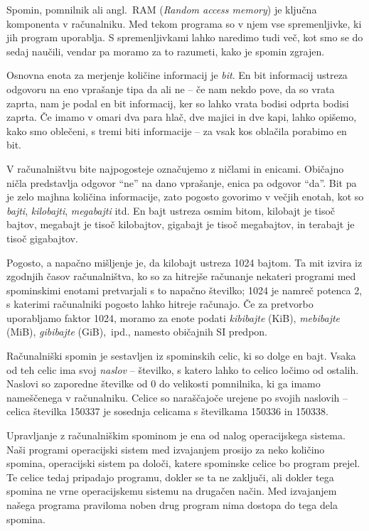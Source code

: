 \documentclass{book}
\begin{document}
Spomin, pomnilnik ali angl.~RAM (\textit{Random access memory})
je ključna komponenta v računalniku. Med tekom programa so v njem vse
spremenljivke, ki jih program uporablja. S spremenljivkami lahko naredimo tudi
več, kot smo se do sedaj naučili, vendar pa moramo za to razumeti, kako je
spomin zgrajen.

Osnovna enota za merjenje količine informacij je \emph{bit}.
En bit informacij ustreza odgovoru na eno vprašanje tipa da ali ne
-- če nam nekdo pove, da so vrata zaprta, nam je podal en bit informacij,
ker so lahko vrata bodisi odprta bodisi zaprta.
Če imamo v omari dva para hlač, dve majici in dve kapi, lahko opišemo,
kako smo oblečeni, s tremi biti informacije -- za vsak kos oblačila porabimo
en bit.

V računalništvu bite najpogosteje označujemo z ničlami in enicami.
Običajno ničla predstavlja odgovor ``ne'' na dano vprašanje,
enica pa odgovor ``da''. Bit pa je zelo majhna količina informacije, zato
pogosto govorimo v večjih enotah, kot so \emph{bajti}, \emph{kilobajti},
\emph{megabajti} itd. En bajt ustreza osmim bitom, kilobajt je tisoč bajtov,
megabajt je tisoč kilobajtov, gigabajt je tisoč megabajtov, in terabajt je
tisoč gigabajtov.

\begin{errors}
  Pogosto, a napačno mišljenje je, da kilobajt ustreza 1024 bajtom.
  Ta mit izvira iz zgodnjih časov računalništva, ko so za hitrejše
  računanje nekateri programi med spominskimi enotami pretvarjali
  s to napačno številko; 1024 je namreč potenca 2, s katerimi računalniki
  pogosto lahko hitreje računajo.
  Če za pretvorbo uporabljamo faktor 1024, moramo za enote podati
  \emph{kibibajte} (KiB), \emph{mebibajte} (MiB), \emph{gibibajte} (GiB),~ipd.,
  namesto običajnih SI predpon.
\end{errors}

Računalniški spomin je sestavljen iz spominskih celic, ki so dolge en bajt.
Vsaka od teh celic ima svoj \emph{naslov} -- številko, s katero lahko to
celico ločimo od ostalih. Naslovi so zaporedne številke od 0 do velikosti
pomnilnika, ki ga imamo nameščenega v računalniku.
Celice so naraščajoče urejene po svojih naslovih -- celica številka 150337 je
sosednja celicama s številkama 150336 in 150338.

Upravljanje z računalniškim spominom je ena od nalog operacijskega sistema.
Naši programi operacijski sistem med izvajanjem prosijo za neko količino spomina,
operacijski sistem pa določi, katere spominske celice bo program prejel.
Te celice tedaj pripadajo programu, dokler se ta ne zaključi, ali dokler tega
spomina ne vrne operacijskemu sistemu na drugačen način. Med izvajanjem
našega programa praviloma noben drug program nima dostopa do tega dela
spomina.
\end{document}
